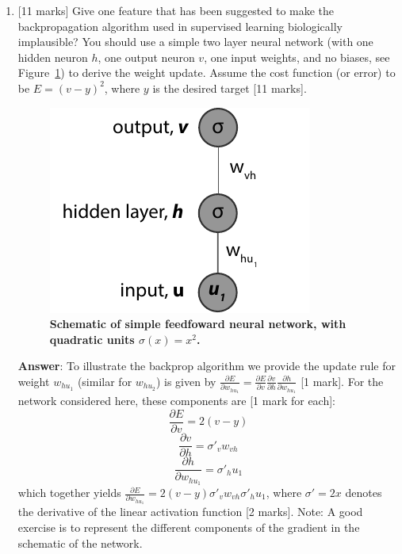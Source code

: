 \documentclass{article}
\newif\ifanswer
\begin{document}
\begin{enumerate}
\begin{enumerate}
  \ifanswer \textbf{Answer}: The classical example of supervised learning in the brain is in the cerebellum, where specific error signals appears to be computed [2.5 marks]. However, the cortex may also use some forms of supervised learning by relying on internally generated supervised signals, which may in turn use algorithms akin to the backpropagation algorithm to efficiently update synaptic weights [2.5 marks].\\
  \fi


\item{}[11 marks] Give one feature that has been suggested to make the backpropagation algorithm used in supervised learning biologically implausible? You should use a simple two layer neural network (with one hidden neuron $h$, one output neuron $v$, one input weights, and no biases, see Figure~\ref{fig:backprop_ff}) to derive the weight update. Assume the cost function (or error) to be $E = (v-y)^2$, where $y$ is the desired target [11 marks].

\begin{figure}[htb!]
  \centering
  \includegraphics[width=0.4\linewidth]{backprop_ff}
  \caption{\textbf{Schematic of simple feedfoward neural network, with quadratic units $\sigma (x) = x^2$.}}
  \label{fig:backprop_ff}
\end{figure}

  \ifanswer \textbf{Answer}: To illustrate the backprop algorithm we provide the update rule for weight $w_{hu_1}$ (similar for $w_{hu_2}$) is given by $\frac{\partial E}{\partial w_{hu_1}} = \frac{\partial E}{\partial v}\frac{\partial v}{\partial h}\frac{\partial h}{\partial w_{hu_1}}$ [1 mark]. For the network considered here, these components are [1 mark for each]:
\begin{equation}
\frac{\partial E}{\partial v} = 2(v-y)
\label{eq:dEdv}
\end{equation}
\begin{equation}
\frac{\partial v}{\partial h} = \sigma'_v w_{vh}
\label{eq:dvdh}
\end{equation}
\begin{equation}
\frac{\partial h}{\partial w_{hu_1}} = \sigma'_h u_1
\label{eq:dhdw}
\end{equation}
which together yields $\frac{\partial E}{\partial w_{hu_1}} = 2(v-y) \sigma'_v w_{vh} \sigma'_h u_1$, where $\sigma'=2x$ denotes the derivative of the linear activation function [2 marks]. Note: A good exercise is to represent the different components of the gradient in the schematic of the network.\\



\end{enumerate}
\end{enumerate}
\end{document}
